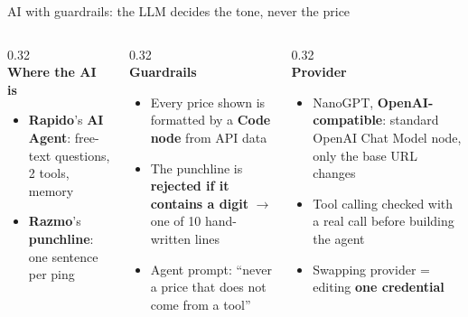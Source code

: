 \documentclass[aspectratio=169,11pt]{beamer}
\newcommand{\rapido}{{\color{rapidored}\bfseries Rapido}}
\newcommand{\razmo}{{\color{razmoblue}\bfseries Razmo}}
\begin{document}
\begin{frame}{AI with guardrails: the LLM decides the tone, never the price}
  \begin{columns}[T]
    \begin{column}{0.32\textwidth}
      \centering{\Large\color{ratzorange}\faRobot}\\[2pt]
      \textbf{Where the AI is}\\[4pt]
      \footnotesize\raggedright
      \begin{itemize}\setlength{\itemsep}{2pt}
        \item \rapido's \textbf{AI Agent}: free-text questions, 2 tools, memory
        \item \razmo's \textbf{punchline}: one sentence per ping
      \end{itemize}
      \vspace{6pt}
    \end{column}
    \begin{column}{0.32\textwidth}
      \centering{\Large\color{okgreen}\faShield*}\\[2pt]
      \textbf{Guardrails}\\[4pt]
      \footnotesize\raggedright
      \begin{itemize}\setlength{\itemsep}{2pt}
        \item Every price shown is formatted by a \textbf{Code node} from API data
        \item The punchline is \textbf{rejected if it contains a digit} \(\rightarrow\) one of 10 hand-written lines
        \item Agent prompt: ``never a price that does not come from a tool''
      \end{itemize}
    \end{column}
    \begin{column}{0.32\textwidth}
      \centering{\Large\color{razmoblue}\faPlug}\\[2pt]
      \textbf{Provider}\\[4pt]
      \footnotesize\raggedright
      \begin{itemize}\setlength{\itemsep}{2pt}
        \item NanoGPT, \textbf{OpenAI-compatible}: standard OpenAI Chat Model node, only the base URL changes
        \item Tool calling checked with a real call before building the agent
        \item Swapping provider = editing \textbf{one credential}
      \end{itemize}
    \end{column}
  \end{columns}
\end{frame}
\end{document}
